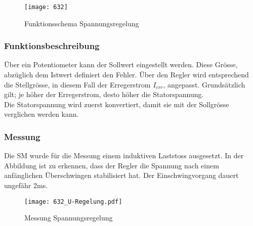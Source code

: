 \begin{flushleft}
\vspace{0.3cm}



\begin{figure}[H]
    \centering
        \texttt{[image: 632]}
    \caption{Funktionsschema Spannungsregelung}
    \label{fig:shemaSpannungsregler}
\end{figure}



\subsubsection{Funktionsbeschreibung}
\vspace{0.3cm}
Über ein Potentiometer kann der Sollwert eingestellt werden. Diese Grösse, abzüglich dem Istwert definiert den Fehler. Über den Regler wird entsprechend die Stellgrösse, in diesem Fall der Erregerstrom $I_{err}$, angepasst. Grundsätzlich gilt; je höher der Erregerstrom, desto höher die Statorspannung. \\
Die Statorspannung wird zuerst konvertiert, damit sie mit der Sollgrösse verglichen werden kann.

\newpage


\subsubsection{Messung}
Die SM wurde für die Messung einem induktiven Laststoss ausgesetzt. In der Abbildung ist zu erkennen, dass der Regler die Spannung nach einem anfänglichen Überschwingen stabilisiert hat. Der Einschwingvorgang dauert ungefähr 2ms.\\

\vspace{0.5cm}



\begin{figure}[H]
    \centering
        \texttt{[image: 632\_U-Regelung.pdf]}
    \caption{Messung Spannungsregelung}
    \label{fig:MessungSpannungsregler}
\end{figure}







\end{flushleft}
